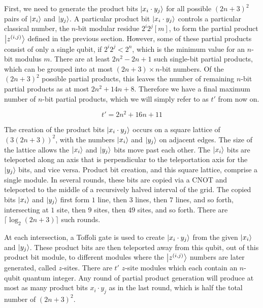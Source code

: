 First, we need to generate the product bits
$\left\vert{x_i\cdot y_j}\right\rangle$ for all possible $(2n+3)^2$ pairs of $\left\vert{x_i}\right\rangle$ and
$\left\vert{y_j}\right\rangle$.
A particular product bit $\left\vert{x_i \cdot y_j}\right\rangle$
controls a particular classical number, the
$n$-bit modular residue $2^i 2^j [m]$, to form the partial product
$\left\vert{z^{(i,j)}}\right\rangle$ defined
in the previous section. However, some of these partial products
consist of only a single qubit, if $2^i 2^j < 2^n$, which is the minimum
value for an $n$-bit modulus $m$. There are at least $2n^2 - 2n + 1$
such single-bit partial products, which can be grouped into at most
$(2n+3)\times n$-bit numbers. Of the $(2n+3)^2$ possible partial products,
this leaves the number of remaining $n$-bit partial products as at most
$2n^2 + 14n +8$. Therefore we have a final maximum number of $n$-bit
partial products, which we will simply refer to as $t'$ from now on.

\begin{equation}
t'=2n^2+16n+11
\label{eqn:tprime}
\end{equation}

The creation of the product bits $\left\vert{x_i \cdot y_j}\right\rangle$ occurs on a
square lattice of $(3(2n+3))^2$, with the numbers $\left\vert{x_i}\right\rangle$ and
$\left\vert{y_j}\right\rangle$ on adjacent edges. The size of the lattice
allows the $\left\vert{x_i}\right\rangle$ and $\left\vert{y_j}\right\rangle$ bits move past each other.
The $\left\vert{x_i}\right\rangle$ bits are teleported along an axis that is perpendicular to
the teleportation axis for the $\left\vert{y_j}\right\rangle$ bits, and vice versa.
Product bit creation, and this square lattice, comprise a single module.
In several
rounds, these bits are copied via a CNOT and teleported to the middle of
a recursively halved interval of the grid. The copied bits $\left\vert{x_i}\right\rangle$ and
$\left\vert{y_j}\right\rangle$
first form $1$ line, then $3$ lines, then $7$ lines, and so forth,
intersecting at $1$ site, then $9$ sites, then $49$ sites, and so forth.
There are $\lceil \log_2 (2n+3) \rceil$ such rounds.

At each intersection, a Toffoli gate is used to create $\left\vert{x_i \cdot y_j}\right\rangle$
from the given $\left\vert{x_i}\right\rangle$ and $\left\vert{y_j}\right\rangle$. These product bits are then
teleported away from this qubit, out of this product bit module, to different
modules where the $\left\vert{z^{(i,j)}}\right\rangle$ numbers are later generated,
called $z$-sites. There are $t'$ $z$-site modules which each contain 
an $n$-qubit quantum integer. Any
round of partial product generation will produce at most as many product
bits $x_i \cdot y_j$ as in the last round, which is half the total number
of $(2n+3)^2$.

